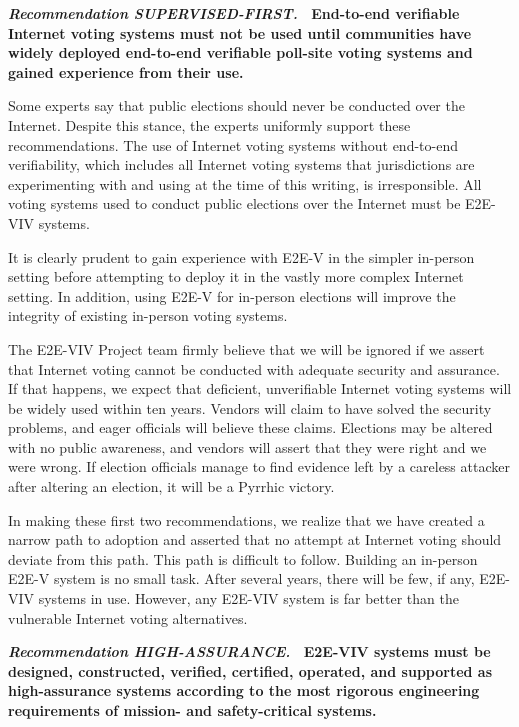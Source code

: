 \textbf{\emph{Recommendation SUPERVISED-FIRST.} \ End-to-end
  verifiable Internet voting systems must not be used until
  communities have widely deployed end-to-end verifiable poll-site
  voting systems and gained experience from their use.}

Some experts say that public elections should never be conducted over
the Internet. Despite this stance, the experts uniformly support these
recommendations. The use of Internet voting systems without end-to-end
verifiability, which includes all Internet voting systems that
jurisdictions are experimenting with and using at the time of this
writing, is irresponsible. All voting systems used to conduct public
elections over the Internet must be E2E-VIV systems.

It is clearly prudent to gain experience with E2E-V in the simpler
in-person setting before attempting to deploy it in the vastly more
complex Internet setting. In addition, using E2E-V for in-person
elections will improve the integrity of existing in-person voting
systems.
 
The E2E-VIV Project team firmly believe that we will be ignored if we
assert that Internet voting cannot be conducted with adequate security
and assurance. If that happens, we expect that deficient, unverifiable
Internet voting systems will be widely used within ten years.  Vendors
will claim to have solved the security problems, and eager officials
will believe these claims.  Elections may be altered with no public
awareness, and vendors will assert that they were right and we were
wrong.  If election officials manage to find evidence left by a
careless attacker after altering an election, it will be a Pyrrhic
victory.
 
In making these first two recommendations, we realize that we have
created a narrow path to adoption and asserted that no attempt at
Internet voting should deviate from this path.  This path is difficult
to follow.  Building an in-person E2E-V system is no small task.
After several years, there will be few, if any, E2E-VIV systems in
use.  However, any E2E-VIV system is far better than the vulnerable
Internet voting alternatives. 

\vspace{12pt} 
\textbf{\emph{Recommendation HIGH-ASSURANCE.} \ E2E-VIV systems must
  be designed, constructed, verified, certified, operated, and
  supported as high-assurance systems according to the most rigorous
  engineering requirements of mission- and safety-critical systems.}


